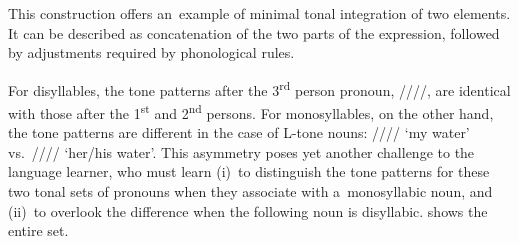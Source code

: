 \begin{figure}[b]
	\label{fig:concat}
\end{figure}

This construction offers an~example of minimal tonal integration of two elements. It can be
described as concatenation of the two parts of the expression, followed by adjustments required by phonological rules.

For disyllables, the tone patterns after the 3\textsuperscript{rd} person pronoun, ////, are
identical with those after the 1\textsuperscript{st} and 2\textsuperscript{nd} persons. For
monosyllables, on the other hand, the tone patterns are different in the case of L-tone nouns: //// ‘my water’ vs.\ //// ‘her/his water’. This asymmetry poses yet another
challenge to the language learner, who must learn (i)~to distinguish the tone patterns for these two
tonal sets of pronouns when they associate with a~{monosyllabic} noun, and (ii)~to overlook the
difference when the following noun is disyllabic.  shows the entire set.

